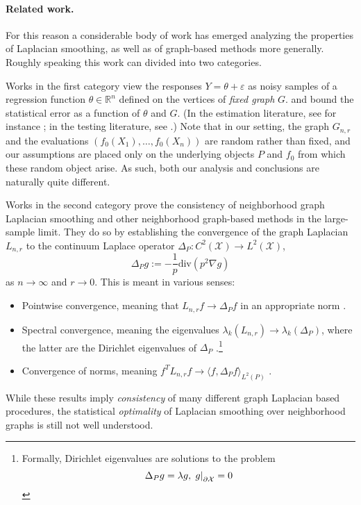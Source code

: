 \documentclass{article}
\newcommand{\Reals}{\mathbb{R}}
\newcommand{\restr}[2]{\ensuremath{\left.#1\right|_{#2}}}
\newcommand{\1}{\mathbf{1}}
\newcommand{\Lap}{L}
\newcommand{\Xset}{\mathcal{X}}
\newcommand{\Leb}{L}
\newcommand{\dive}{\mathrm{div}}
\theoremstyle{alden}
\theoremstyle{aldenthm}
\theoremstyle{definition}
\theoremstyle{remark}
\begin{document}
\paragraph{Related work.} For this reason a considerable body of work has emerged analyzing the properties of Laplacian smoothing, as well as of graph-based methods more generally. Roughly speaking this work can divided into two categories.

Works in the first category view the responses $Y = \theta + \varepsilon$ as noisy samples of a regression function $\theta \in \Reals^n$ defined on the vertices of \emph{fixed graph} $G$. and bound the statistical error as a function of $\theta$ and $G$. (In the estimation literature, see for instance \citep{wang2016, sadhanala16,sadhanala17,kirichenko2017,kirichenko2018}; in the testing literature, see \citep{sharpnack2013,sharpnack2013b,sharpnack2015}.) Note that in our setting, the graph $G_{n,r}$ and the evaluations $(f_0(X_1),\ldots,f_0(X_n))$ are random rather than fixed, and our assumptions are placed only on the underlying objects $P$ and $f_0$ from which these random object arise. As such, both our analysis and conclusions are naturally quite different.

Works in the second category prove the consistency of neighborhood graph Laplacian smoothing and other neighborhood graph-based methods in the large-sample limit. They do so by establishing the convergence of the graph Laplacian $\Lap_{{n,r}}$ to the continuum Laplace operator $\Delta_P: C^2(\Xset) \to \Leb^2(\Xset)$,
\begin{equation}
\label{eqn:laplace_operator}
\Delta_Pg := -\frac{1}{p} \dive(p^2 \nabla g)
\end{equation}
as $n \to \infty$ and $r \to 0$. This is meant in various senses:
\begin{itemize}
	\item Pointwise convergence, meaning that $\Lap_{n,r}f \to \Delta_Pf$ in an appropriate norm \citep{belkin03,belkin05,lafon04,hein05,singer06,gine06}. 
	\item Spectral convergence, meaning the eigenvalues $\lambda_k(\Lap_{n,r}) \to \lambda_k(\Delta_P)$, where the latter are the Dirichlet eigenvalues of $\Delta_P$ \citep{belkin07,burago2014,trillos2018,trillos2019,calder2019}.\footnote{\label{footnote:dirichlet_eigenvalues} Formally, Dirichlet eigenvalues are solutions to the problem
		$$
		\Delta_Pg = \lambda g,\\
		\restr{g}{\partial \Xset} = 0
		$$} 
	\item Convergence of norms, meaning $f^T \Lap_{n,r} f \to \langle f,\Delta_Pf \rangle_{\Leb^2(P)}$ \citep{bousquet03,hein06,zhou11}. 
\end{itemize}
While these results imply \emph{consistency} of many different graph Laplacian based procedures, the statistical \emph{optimality} of Laplacian smoothing over neighborhood graphs is still not well understood.
\end{document}
